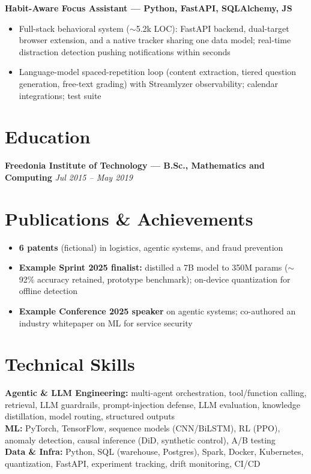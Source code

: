 \documentclass[10pt]{article}
\newcommand{\entry}[2]{\textbf{#1} \hfill \textit{#2}\\[-0.35em]}
\newcommand{\proj}[1]{\vspace{0.5pt}\textbf{#1}\\[-0.4em]}
\begin{document}
\proj{Habit-Aware Focus Assistant — Python, FastAPI, SQLAlchemy, JS}
\begin{itemize}
\item Full-stack behavioral system ($\sim$5.2k LOC): FastAPI backend, dual-target browser extension, and a native tracker sharing one data model; real-time distraction detection pushing notifications within seconds
\item Language-model spaced-repetition loop (content extraction, tiered question generation, free-text grading) with Streamlyzer observability; calendar integrations; test suite
\end{itemize}

\section{Education}
\entry{Freedonia Institute of Technology — B.Sc., Mathematics and Computing}{Jul 2015 -- May 2019}

\section{Publications \& Achievements}
\begin{itemize}
\item \textbf{6 patents} (fictional) in logistics, agentic systems, and fraud prevention
\item \textbf{Example Sprint 2025 finalist:} distilled a 7B model to 350M params ($\sim$92\% accuracy retained, prototype benchmark); on-device quantization for offline detection
\item \textbf{Example Conference 2025 speaker} on agentic systems; co-authored an industry whitepaper on ML for service security
\end{itemize}

\section{Technical Skills}
\textbf{Agentic \& LLM Engineering:} multi-agent orchestration, tool/function calling, retrieval, LLM guardrails, prompt-injection defense, LLM evaluation, knowledge distillation, model routing, structured outputs\\
\textbf{ML:} PyTorch, TensorFlow, sequence models (CNN/BiLSTM), RL (PPO), anomaly detection, causal inference (DiD, synthetic control), A/B testing\\
\textbf{Data \& Infra:} Python, SQL (warehouse, Postgres), Spark, Docker, Kubernetes, quantization, FastAPI, experiment tracking, drift monitoring, CI/CD
\end{document}

